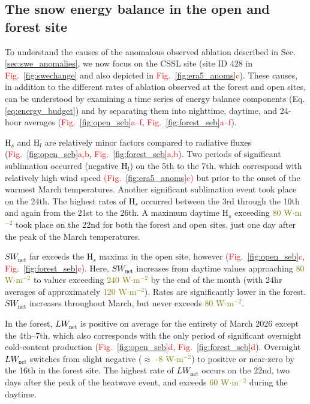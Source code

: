 \documentclass[draft]{agujournal2019}
\newcommand{\fig}[2]{\textcolor{red}{(Fig.~\ref{#1}{#2})}}   %
\newcommand{\fignop}[2]{\textcolor{red}{Fig.~\ref{#1}{#2}}}  %
\newcommand{\mynum}[1]{\textcolor{olive}{#1}}
\newcommand{\lwnet}{\textcolor{black}{$LW_{\mathrm{net}}$}\xspace}
\newcommand{\hs}{\textcolor{black}{H$_s$}\xspace}
\newcommand{\hlat}{\textcolor{black}{H$_l$}\xspace}
\newcommand{\swnet}{\textcolor{black}{$SW_{\mathrm{net}}$}\xspace}
\newcommand{\wmsq}{\textcolor{olive}{W$\cdot$m$^{-2}$}\xspace}
\begin{document}

\subsection{The snow energy balance in the open and forest site}
To understand the causes of the anomalous observed ablation described in Sec. \ref{sec:swe_anomalies}, we now focus on the CSSL site (site ID 428 in \fignop{fig:swechange}{} and also depicted in \fignop{fig:era5_anoms}{c}).
These causes, in addition to the different rates of ablation observed at the forest and open sites, can be understood by examining a time series of energy balance components (Eq. \ref{eq:energy_budget}) and by separating them into nighttime, daytime, and 24-hour averages (\fignop{fig:open_seb}{a--f}, \fignop{fig:forest_seb}{a--f}).

\hs and \hlat are relatively minor factors compared to radiative fluxes (\fignop{fig:open_seb}{a,b}, \fignop{fig:forest_seb}{a,b}).
Two periods of significant sublimation occurred (negative \hlat) on the 5th to the 7th, which correspond with relatively high wind speed \fig{fig:era5_anoms}{c} but prior to the onset of the warmest March temperatures.
Another significant sublimation event took place on the 24th.
The highest rates of \hs occurred between the 3rd through the 10th and again from the 21st to the 26th.
A maximum daytime \hs exceeding \mynum{80} \wmsq took place on the 22nd for both the forest and open sites, just one day after the peak of the March temperatures.

\swnet far exceeds the \hs maxima in the open site, however  (\fignop{fig:open_seb}{c}, \fignop{fig:forest_seb}{c}).
Here, \swnet increases from daytime values approaching \mynum{80} \wmsq to values exceeding \mynum{240} \wmsq by the end of the month (with 24hr averages of approximately  \mynum{120} \wmsq).
Rates are significantly lower in the forest.
\swnet increases throughout March, but never exceeds \mynum{80} \wmsq.

In the forest, \lwnet is positive on average for the entirety of March 2026 except the 4th--7th, which also corresponds with the only period of significant overnight cold-content production (\fignop{fig:open_seb}{d}, \fignop{fig:forest_seb}{d}).
Overnight \lwnet switches from slight negative ($\approx$ \mynum{-8} \wmsq) to positive or near-zero by the 16th in the forest site.
The highest rate of \lwnet occurs on the 22nd, two days after the peak of the heatwave event, and exceeds \mynum{60} \wmsq during the daytime.
\end{document}
